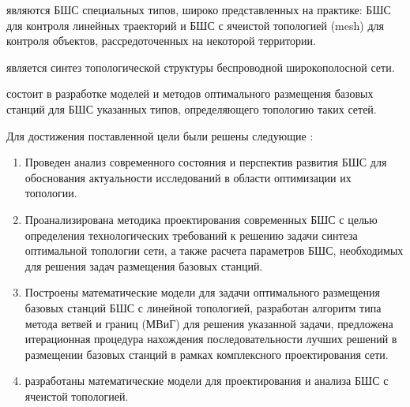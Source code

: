 {\objectresearch} являются БШС специальных типов, широко представленных на практике: БШС для контроля линейных траекторий и БШС с ячеистой топологией (mesh) для контроля объектов, рассредоточенных на некоторой территории.

{\subjectresearch} является синтез топологической структуры беспроводной широкополосной сети.

{\aim} состоит в разработке моделей и методов оптимального размещения базовых станций для БШС указанных типов, определяющего топологию таких сетей.

Для достижения поставленной цели были решены следующие {\tasks}:
\begin{enumerate}[beginpenalty=10000] %
  \item Проведен анализ современного состояния и перспектив развития БШС для  обоснования  актуальности исследований в области оптимизации их топологии. 
  \item Проанализирована методика проектирования современных БШС с целью определения технологических требований к решению задачи синтеза оптимальной топологии сети, а также расчета параметров БШС, необходимых для решения задач размещения базовых станций.
  \item Построены математические модели для задачи оптимального размещения базовых станций БШС с линейной топологией, разработан алгоритм типа метода ветвей и границ (МВиГ) для решения указанной задачи, предложена итерационная процедура нахождения последовательности лучших решений в размещении базовых станций в рамках комплексного проектирования сети.
  \item разработаны математические модели для проектирования и анализа БШС с ячеистой топологией.

\end{enumerate}



